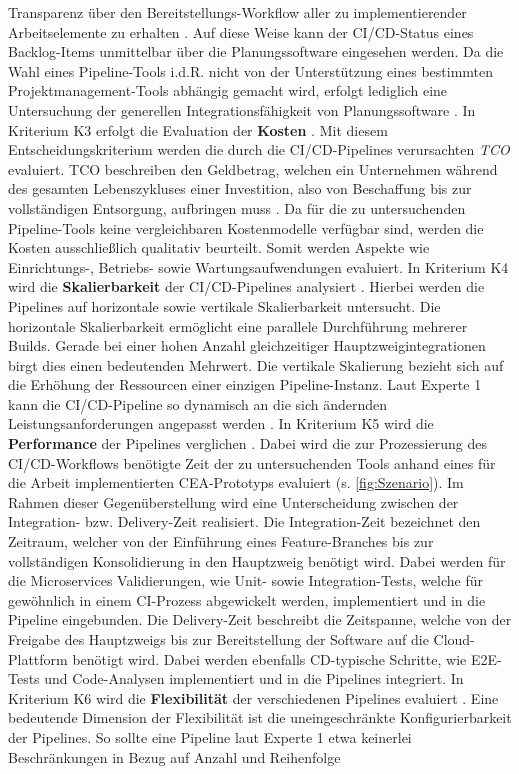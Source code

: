 Transparenz über den Bereitstellungs-Workflow aller zu implementierender Arbeitselemente zu erhalten \cite[Z. 96 ff.]{TestDeveloperSAPHyperspaceAdoption&Onboarding.}. Auf diese Weise kann der CI/CD-Status eines Backlog-Items unmittelbar über die Planungssoftware eingesehen werden. Da die Wahl eines Pipeline-Tools i.d.R. nicht von der Unterstützung eines bestimmten Projektmanagement-Tools abhängig gemacht wird, erfolgt lediglich eine Untersuchung der generellen Integrationsfähigkeit von Planungssoftware \cite[Z. 96 ff.]{TestDeveloperSAPHyperspaceAdoption&Onboarding.}. In Kriterium K3 erfolgt die Evaluation der \textbf{Kosten} \cite[Z. 42 ff.]{ProductManagerSAPHyperspaceCICD.}. Mit diesem Entscheidungskriterium werden die durch die CI/CD-Pipelines verursachten \textit{\ac{TCO}} evaluiert. TCO beschreiben den Geldbetrag, welchen ein Unternehmen während des gesamten Lebenszykluses einer Investition, also von Beschaffung bis zur vollständigen Entsorgung, aufbringen muss \cite[4]{Ellram.1993}. Da für die zu untersuchenden Pipeline-Tools keine vergleichbaren Kostenmodelle verfügbar sind, werden die Kosten ausschließlich qualitativ beurteilt. Somit werden Aspekte wie Einrichtungs-, Betriebs- sowie Wartungsaufwendungen evaluiert. In Kriterium K4 wird die \textbf{Skalierbarkeit} der CI/CD-Pipelines analysiert \cite[Z. 69 ff.]{ProductOwnerSAPBTPProd&Infra.}. Hierbei werden die Pipelines auf horizontale sowie vertikale Skalierbarkeit untersucht. Die horizontale Skalierbarkeit ermöglicht eine parallele Durchführung mehrerer Builds. Gerade bei einer hohen Anzahl gleichzeitiger Hauptzweigintegrationen birgt dies einen bedeutenden Mehrwert. Die vertikale Skalierung bezieht sich auf die Erhöhung der Ressourcen einer einzigen Pipeline-Instanz. Laut Experte 1 kann die CI/CD-Pipeline so dynamisch an die sich ändernden Leistungsanforderungen angepasst werden \cite[Z. 74 ff.]{ProductOwnerSAPBTPProd&Infra.}. In Kriterium K5 wird die \textbf{Performance} der Pipelines verglichen \cite[Z. 35 ff.]{ProductManagerSAPHyperspaceCICD.}. Dabei wird die zur Prozessierung des CI/CD-Workflows benötigte Zeit der zu untersuchenden Tools anhand eines für die Arbeit implementierten CEA-Prototyps evaluiert (s. \ref{fig:Szenario}). Im Rahmen dieser Gegenüberstellung wird eine Unterscheidung zwischen der Integration- bzw. Delivery-Zeit realisiert. Die Integration-Zeit bezeichnet den Zeitraum, welcher von der Einführung eines Feature-Branches bis zur vollständigen Konsolidierung in den Hauptzweig benötigt wird. Dabei werden für die Microservices Validierungen, wie Unit- sowie Integration-Tests, welche für gewöhnlich in einem CI-Prozess abgewickelt werden, implementiert und in die Pipeline eingebunden. Die Delivery-Zeit beschreibt die Zeitspanne, welche von der Freigabe des Hauptzweigs bis zur Bereitstellung der Software auf die Cloud-Plattform benötigt wird. Dabei werden ebenfalls CD-typische Schritte, wie E2E-Tests und Code-Analysen implementiert und in die Pipelines integriert. In Kriterium K6 wird die \textbf{Flexibilität} der verschiedenen Pipelines evaluiert \cite[Z. 70 ff.]{ProductOwnerSAPBTPProd&Infra.}. Eine bedeutende Dimension der Flexibilität ist die uneingeschränkte Konfigurierbarkeit der Pipelines. So sollte eine Pipeline laut Experte 1 etwa keinerlei Beschränkungen in Bezug auf Anzahl und Reihenfolge 